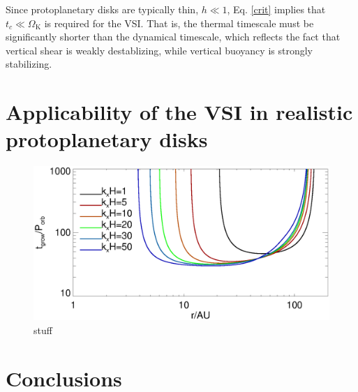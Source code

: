 \documentclass{iau}
\begin{document}
Since protoplanetary disks are typically thin, $h\ll 1$,
Eq. \ref{crit} implies that $t_c \ll \Omega_\mathrm{K}$ is required
for the VSI. That is, the thermal timescale must be significantly
shorter than the dynamical timescale, which reflects the fact that
vertical shear is weakly destablizing, while vertical buoyancy is
strongly stabilizing. 




\section{Applicability of the VSI in realistic protoplanetary disks} 

\begin{figure}
  \begin{center}
    \includegraphics[width=\linewidth]{eigen_compare_grow.ps} 
    \caption{stuff
      \label{mmsn}}
  \end{center}
\end{figure}




\section{Conclusions}
\end{document}
